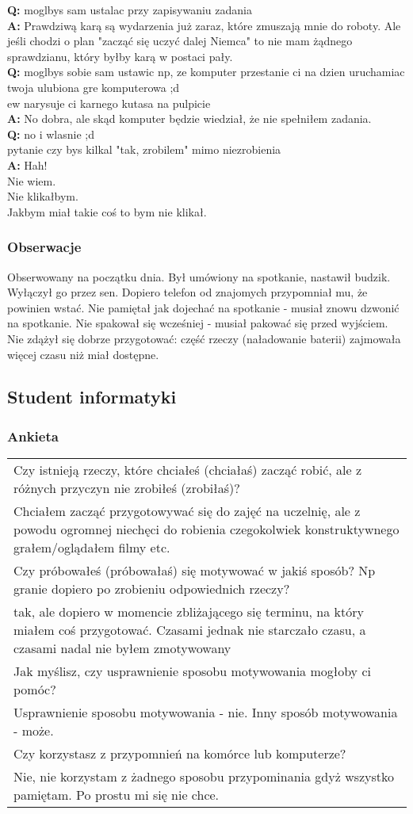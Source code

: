 \documentclass[11pt,wide]{mwart}
\newcommand{\w}[1]{
    \indent\textbf{#1}
 }
\newcommand{\Ta}[1]{
  \begin{tabular}{| p{0.9\textwidth} |}
    \hline
    #1
    \hline
  \end{tabular}
 }
\begin{document}
\begin{multicols}{2}
\w{Q:}moglbys sam ustalac przy zapisywaniu zadania\\
\w{A:}Prawdziwą karą są wydarzenia już zaraz, które zmuszają mnie do roboty. Ale jeśli chodzi o plan "zacząć się uczyć dalej Niemca" to nie mam żądnego sprawdzianu, który byłby karą w postaci pały.\\
\w{Q:}moglbys sobie sam ustawic np, ze komputer przestanie ci na dzien uruchamiac twoja ulubiona gre komputerowa ;d\\
ew narysuje ci karnego kutasa na pulpicie\\
\w{A:}No dobra, ale skąd komputer będzie wiedział, że nie spełniłem zadania.\\
\w{Q:}no i wlasnie ;d\\
pytanie czy bys kilkal "tak, zrobilem" mimo niezrobienia\\
\w{A:}Hah!\\
Nie wiem.\\
Nie klikałbym.\\
Jakbym miał takie coś to bym nie klikał.\\
\end{multicols}
\subsubsection{Obserwacje}
Obserwowany na początku dnia. Był umówiony na spotkanie, nastawił budzik. Wyłączył go przez sen. Dopiero telefon od znajomych przypomniał mu, że powinien wstać. Nie pamiętał jak dojechać na spotkanie - musiał znowu dzwonić na spotkanie. Nie spakował się wcześniej - musiał pakować się przed wyjściem. Nie zdążył się dobrze przygotować: część rzeczy (naładowanie baterii) zajmowała więcej czasu niż miał dostępne.
\subsection{Student informatyki}
\subsubsection{Ankieta}
\Ta{
\noindent Czy istnieją rzeczy, które chciałeś (chciałaś) zacząć robić, ale z różnych przyczyn nie zrobiłeś (zrobiłaś)?\\
\indent Chciałem zacząć przygotowywać się do zajęć na uczelnię, ale z powodu ogromnej niechęci do robienia czegokolwiek konstruktywnego grałem/oglądałem filmy etc.\\
Czy próbowałeś (próbowałaś) się motywować w jakiś sposób? Np granie dopiero po zrobieniu odpowiednich rzeczy?\\
\indent tak, ale dopiero w momencie zbliżającego się terminu, na który miałem coś przygotować. Czasami jednak nie starczało czasu, a czasami nadal nie byłem zmotywowany\\
Jak myślisz, czy usprawnienie sposobu motywowania mogłoby ci pomóc?\\
\indent Usprawnienie sposobu motywowania - nie. Inny sposób motywowania - może.\\
Czy korzystasz z przypomnień na komórce lub komputerze?\\
\indent Nie, nie korzystam z żadnego sposobu przypominania gdyż wszystko pamiętam. Po prostu mi się nie chce.\\}
\end{document}
